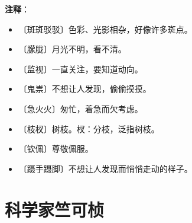 \documentclass[12pt,UTF-8,openany]{ctexbook}
\begin{document}
\newpage

\textbf{注释}：

\vspace{-1em}

\begin{itemize}
    \setlength\itemsep{-0.2em}
    \item 〔斑斑驳驳〕色彩、光影相杂，好像许多斑点。
    \item 〔朦胧〕月光不明，看不清。
    \item 〔监视〕一直关注，要知道动向。
    \item 〔鬼祟〕不想让人发现，偷偷摸摸。
    \item 〔急火火〕匆忙，着急而欠考虑。
    \item 〔枝杈〕树枝。杈：分枝，泛指树枝。
    \item 〔钦佩〕尊敬佩服。
    \item 〔蹑手蹑脚〕不想让人发现而悄悄走动的样子。
\end{itemize}

\chapter{科学家竺可桢}
\end{document}
